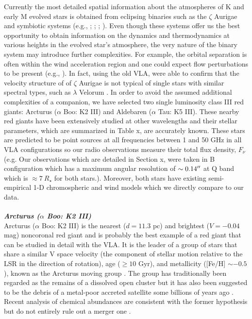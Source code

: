Currently the most detailed spatial information about the atmospheres of K and early M evolved stars is obtained from eclipsing binaries such as the $\zeta$ Aurigae and symbiotic systems (e.g., \citealt{wright_1970}; \citealt{baade_1996}; \citealt{eaton_2008}; \citealt{crowley_2008}). Even though these systems offer us the best opportunity to obtain information on the dynamics and thermodynamics at various heights in the evolved star's atmosphere, the very nature of the binary system may introduce further complexities. For example, the orbital separation is often within the wind acceleration region and one could expect flow perturbations to be present (e.g., \citealt{chapman_1981}). In fact, using the old VLA, \cite{harper_2005} were able to confirm that the velocity structure of  of $\zeta$ Aurigae is not typical of single stars with similar spectral types, such as $\lambda$ Velorum \citep{carpenter_1999}. In order to avoid the assumed additional complexities of a companion, we have selected two single luminosity class III red giants: Arcturus ($\alpha$ Boo: K2 III) and Aldebaren ($\alpha$ Tau: K5 III). These nearby red giants have been extensively studied at other wavelengths and their stellar parameters, which are summarized in Table x, are accurately known. These stars are predicted to be point sources at all frequencies between 1 and 50 GHz in all VLA configurations so our radio observations measure their total flux density, $F_{\nu}$ (e.g. Our observations which are detailed in Section x, were taken in B configuration which has a maximum angular resolution of $\sim 0.14 ^{\prime\prime}$ at Q band which is $\approx 7\ R_{\star}$ for both stars.). Moreover, both stars have existing semi-empirical 1-D chromospheric and wind models which we directly compare to our data.
\\
\\
\textbf{\textit{Arcturus ($\alpha$ Boo: K2 III)}}\\
Arcturus ($\alpha$ Boo: K2 III) is the nearest ($d=11.3$ pc) and brightest ($V=-0.04$ mag) noncoronal red giant and is probably the best example of a red giant that can be studied in detail with the VLA. It is the leader of a group of stars that share a similar V  space velocity (the component of stellar motion relative to the LSR in the direction of rotation),  age ($\geq10$ Gyr), and metallicity ([Fe/H] $\sim -0.5$), known as the Arcturus moving group \citep{eggen_1971}. The group has traditionally been regarded as the remains of a dissolved open cluster \citep[e.g.,][]{eggen_1971,eggen_1996} but it has also been suggested to be  the debris of a metal-poor accreted satellite some billions of years ago \citep{navarro_2004}. Recent analysis of chemical abundances are consistent with the former hypothesis but do not entirely rule out a merger one \citep{williams_2009}.
